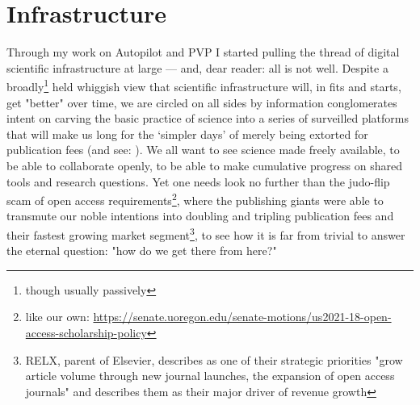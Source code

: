 
\section{Infrastructure}
\label{sec:infrastructure}

Through my work on Autopilot and PVP I started pulling the thread of digital scientific infrastructure at large --- and, dear reader: all is not well. Despite a broadly\footnote{though usually passively} held whiggish view that scientific infrastructure will, in fits and starts, get "better" over time, we are circled on all sides by information conglomerates intent on carving the basic practice of science into a series of surveilled platforms that will make us long for the `simpler days' of merely being extorted for publication fees\cite{pooleySurveillancePublishing2021} (and see: \cite{zuboffBigOtherSurveillance2015}). We all want to see science made freely available, to be able to collaborate openly, to be able to make cumulative progress on shared tools and research questions. Yet one needs look no further than the judo-flip scam of open access requirements\footnote{like our own: \url{https://senate.uoregon.edu/senate-motions/us2021-18-open-access-scholarship-policy}}, where the publishing giants were able to transmute our noble intentions into doubling and tripling publication fees and their fastest growing market segment\footnote{RELX, parent of Elsevier, describes as one of their strategic priorities "grow article volume through new journal launches, the expansion of open access journals" and describes them as their major driver of revenue growth\cite{RELXAnnualReport2020}}, to see how it is far from trivial to answer the eternal question: "how do we get there from here?" 

